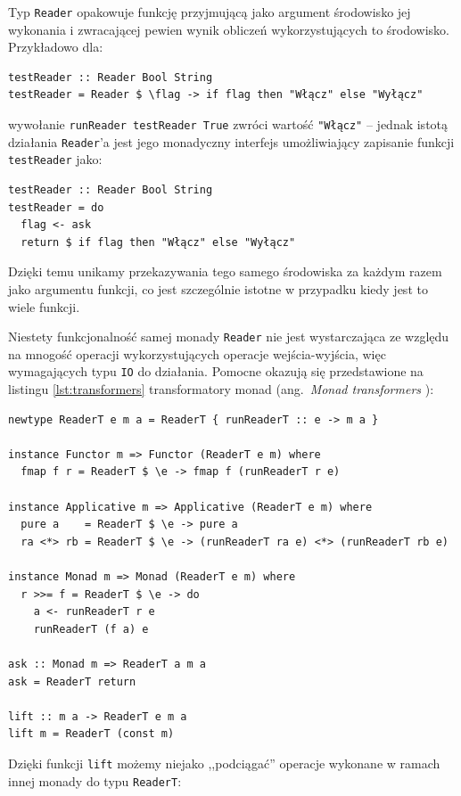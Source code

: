 Typ \lstinline{Reader} opakowuje funkcję przyjmującą jako argument środowisko jej wykonania i zwracającej pewien wynik obliczeń wykorzystujących to środowisko. Przykładowo dla:

\begin{lstlisting}
testReader :: Reader Bool String
testReader = Reader $ \flag -> if flag then "Włącz" else "Wyłącz"
\end{lstlisting}
wywołanie \lstinline{runReader testReader True} zwróci wartość \lstinline{"Włącz"} -- jednak istotą działania \lstinline{Reader}'a jest jego monadyczny interfejs umożliwiający zapisanie funkcji \lstinline{testReader} jako:

\begin{lstlisting}
testReader :: Reader Bool String
testReader = do
  flag <- ask
  return $ if flag then "Włącz" else "Wyłącz"
\end{lstlisting}

Dzięki temu unikamy przekazywania tego samego środowiska za każdym razem jako argumentu funkcji, co jest szczególnie istotne w przypadku kiedy jest to wiele funkcji.

Niestety funkcjonalność samej monady \lstinline{Reader} nie jest wystarczająca ze względu na mnogość operacji wykorzystujących operacje wejścia-wyjścia, więc wymagających typu \texttt{IO} do działania. Pomocne okazują się przedstawione na listingu \ref{lst:transformers} transformatory monad (ang.~\textit{Monad transformers} \cite{Transformers}):

\begin{lstlisting}[caption=Transformator typu Reader, label=lst:transformers]
newtype ReaderT e m a = ReaderT { runReaderT :: e -> m a }

instance Functor m => Functor (ReaderT e m) where
  fmap f r = ReaderT $ \e -> fmap f (runReaderT r e)

instance Applicative m => Applicative (ReaderT e m) where
  pure a    = ReaderT $ \e -> pure a
  ra <*> rb = ReaderT $ \e -> (runReaderT ra e) <*> (runReaderT rb e)

instance Monad m => Monad (ReaderT e m) where 
  r >>= f = ReaderT $ \e -> do
    a <- runReaderT r e
    runReaderT (f a) e

ask :: Monad m => ReaderT a m a
ask = ReaderT return

lift :: m a -> ReaderT e m a
lift m = ReaderT (const m)
\end{lstlisting}
Dzięki funkcji \lstinline{lift} możemy niejako ,,podciągać'' operacje wykonane w ramach innej monady do typu \lstinline{ReaderT}:

